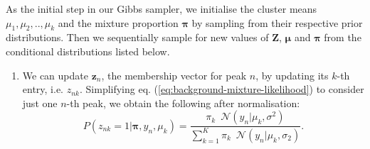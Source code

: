 As the initial step in our Gibbs sampler, we initialise the cluster means $\mu_1,\mu_2,..,\mu_k$ and the mixture proportion $\boldsymbol{\pi}$ by sampling from their respective prior distributions. Then we sequentially sample for new values of $\boldsymbol{Z}$, $\boldsymbol{\mu}$ and $\boldsymbol{\pi}$ from the conditional distributions listed below. 

\begin{enumerate}

\item We can update $\boldsymbol{z}_n$, the membership vector for peak $n$, by updating its $k$-th entry, i.e. $z_{nk}$. Simplifying eq. (\ref{eq:background-mixture-likelihood}) to consider just one $n$-th peak, we obtain the following after normalisation:
\begin{equation}
P(z_{nk}=1 \vert \boldsymbol{\pi}, y_n, \mu_k) = \frac{\pi_k \enspace \mathcal{N}(y_n \vert \mu_k, \sigma^2)}{\sum_{k=1}^K \pi_k \enspace \mathcal{N}(y_n \vert \mu_k, \sigma_2)}.
\label{eq:background-mixture-conditional-z}
\end{equation}


\end{enumerate}
